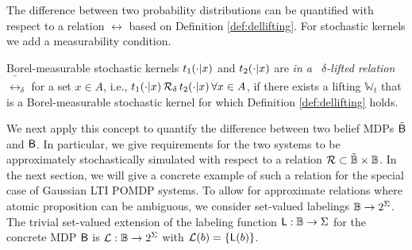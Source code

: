 \documentclass{ifacconf}
\begin{document}
%
%
The difference between two probability distributions can be quantified with respect to a relation $\rel$ based on Definition \ref{def:dellifting}. For stochastic kernels we add a measurability condition.
\begin{definition}\label{def:kernellift}
		Borel-measurable stochastic kernels $t_1(\cdot {\mid} x)$ and $t_2(\cdot {\mid} x)$ are \emph{in a \ $\delta$-lifted relation $\bar \rel_\delta$} for a set $x\in A$, i.e.,  $t_1(\cdot {\mid} x) \,\relax \mathcal{R}_\delta\, t_2(\cdot {\mid} x)\, \forall x\in A$,  if there exists a lifting $\mathbb W_t$ that is a  Borel-measurable stochastic kernel for which Definition \ref{def:dellifting} holds.
\end{definition}
We next apply this concept to quantify the difference between two belief MDPs $\tilde {\mathsf{B}}$ and $\mathsf{B}$. In particular, we give requirements for the two systems  to be approximately stochastically simulated with respect to a relation $\mathcal{R}\subset \tilde {\mathbb{B}} \times \mathbb{B}$. In the next section, we will give a concrete example of such a relation for the special case of Gaussian LTI POMDP systems. To allow for approximate relations where atomic proposition can be ambiguous, we consider set-valued labelings $\mathbb{B}\rightarrow2^\Sigma$. The trivial set-valued extension of the labeling function $\mathsf{L} : \mathbb{B} \rightarrow \Sigma$ for the concrete MDP $\mathsf{B}$ is $\mathcal{L}: \mathbb{B} \rightarrow2^\Sigma$ with $\mathcal{L}(b)=\{\mathsf{L}(b)\}$.
\end{document}
